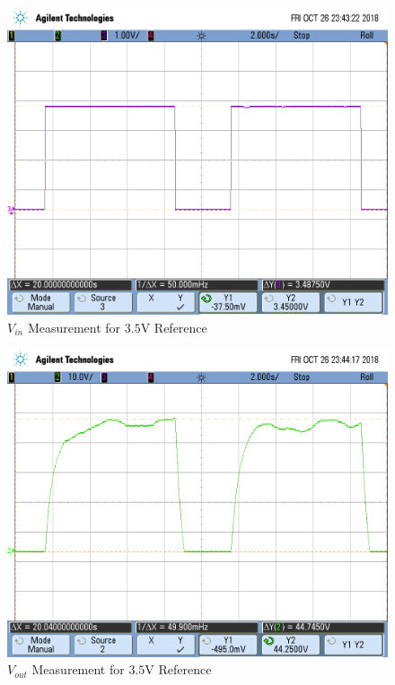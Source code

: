 \FloatBarrier

\begin{figure}[h!]
	\centering
	\includegraphics[scale=0.75]{../images/scope_10.PNG}
	\caption{$V_{in}$ Measurement for $3.5$\si{\volt} Reference}
	\label{fig:scope_10}
\end{figure}

\FloatBarrier

\FloatBarrier

\begin{figure}[h!]
	\centering
	\includegraphics[scale=0.75]{../images/scope_11.PNG}
	\caption{$V_{out}$ Measurement for $3.5$\si{\volt} Reference}
	\label{fig:scope_11}
\end{figure}

